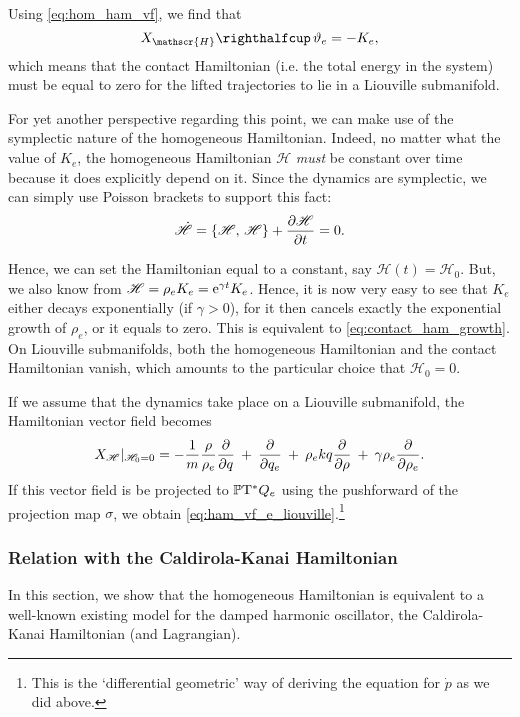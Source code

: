 Using \cref{eq:hom_ham_vf}, we find that 
\begin{equation}
     \intpr{X_\mathscr{H}}{\theta_e} = -K_e,
\end{equation}
which means that the contact Hamiltonian (i.e. the total energy in the system)
must be equal to zero for the lifted trajectories to lie in a Liouville submanifold.

For yet another perspective regarding this point, we can make use of the symplectic nature of the homogeneous Hamiltonian. Indeed, no matter what the value of \(K_e\), the homogeneous Hamiltonian \(\mathscr{H}\) \emph{must} be constant over time because it does explicitly depend on it. Since the dynamics are symplectic, we can simply use Poisson brackets to support this fact:
\begin{equation}
     \dot{\mathscr{H}} = \qty{\mathscr{H},\,\mathscr{H}} + \pdv{\mathscr{H}}{t} = 0.
\end{equation}

Hence, we can set the Hamiltonian equal to a constant, say \(\mathscr{H}(t) = \mathscr{H}_0\). But, we also know from \(\mathscr{H} = \rho_e K_e = \mathrm{e}^{\gamma t} K_e\). Hence, it is now very easy to see that \(K_e\) either  decays exponentially (if \(\gamma > 0\)), for it then cancels exactly the exponential growth of \(\rho_e\), or it equals to zero. This is equivalent to \cref{eq:contact_ham_growth}. On Liouville submanifolds, both the homogeneous Hamiltonian and the contact Hamiltonian vanish, which amounts to the particular choice that \(\mathscr{H}_0 = 0\).

If we assume that the dynamics take place on a Liouville submanifold, the Hamiltonian vector field becomes
\begin{equation}
     X_\mathscr{H}\vert_{\mathscr{H}_0 = 0} =  -\frac{1}{m}\frac{\rho}{\rho_e}\pdv{}{q}\: + \: \pdv{}{q_e}\: + \: \rho_e kq \pdv{}{\rho}\: + \: \gamma \rho_e \pdv{}{\rho_e}.
\end{equation}
If this vector field is be projected to \(\mathbb{P}\mathrm{T}^* Q_e\) using the pushforward of the projection map \(\sigma\), we obtain \cref{eq:ham_vf_e_liouville}.\footnote{This is the `differential geometric' way of deriving the equation for \(\dot{p}\) as we did above.}

\subsubsection{Relation with the Caldirola-Kanai Hamiltonian}
In this section, we show that the homogeneous Hamiltonian is equivalent to a well-known existing model for the damped harmonic oscillator, the Caldirola-Kanai Hamiltonian (and Lagrangian).

